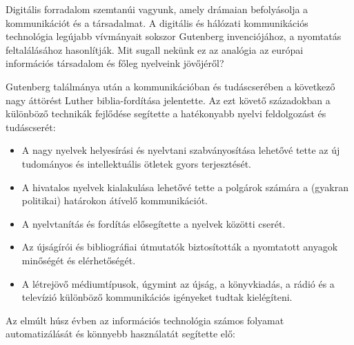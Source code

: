   \clearpage



  \begin{multicols}{2}

  Digitális forradalom szemtanúi vagyunk, amely drámaian befolyásolja a kommunikációt és a társadalmat. A digitális és hálózati kommunikációs technológia legújabb vívmányait sokszor Gutenberg invenciójához, a nyomtatás feltalálásához hasonlítják. Mit sugall nekünk ez az analógia az európai információs társadalom és főleg nyelveink jövőjéről? 


  Gutenberg találmánya után a kommunikációban és tudáscserében a következő nagy áttörést Luther biblia-fordítása jelentette. Az ezt követő századokban a különböző technikák fejlődése segítette a hatékonyabb nyelvi feldolgozást és tu\-dás\-cse\-rét:

  \medskip
  \begin{itemize}
  \item A nagy nyelvek helyesírási és nyelvtani szabványosítása lehetővé tette az új tudományos és intellektuális ötletek gyors terjesztését.
  \item A hivatalos nyelvek kialakulása le\-he\-tő\-vé tette a polgárok számára a (gyakran politikai) határokon átívelő kommunikációt.
  \item A nyelvtanítás és fordítás elősegítette a nyelvek közötti cserét.
  \item Az újságírói és bibliográfiai útmutatók biztosították a nyomtatott anyagok minőségét és elérhetőségét.
  \medskip
  \item A létrejövő médiumtípusok, úgymint az újság, a könyvkiadás, a rádió és a televízió különböző kommunikációs igényeket tudtak kielégíteni.
  \end{itemize}

  Az elmúlt húsz évben az információs technológia számos folyamat automatizálását és könnyebb használatát segítette elő:


\end{multicols}
